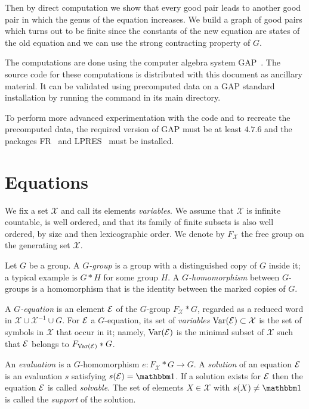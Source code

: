 \documentclass[a4paper,11pt]{amsart}
\begin{document}
Then by direct computation we show that every good pair leads to
another good pair in which the genus of the equation increases.  We
build a graph of good pairs which turns out to be finite since the
constants of the new equation are states of the old equation and we
can use the strong contracting property of $G$.

The computations are done
 using the computer algebra system GAP~\cite{GAP4}. The source
code for these computations is distributed with this document as
ancillary material. It can be validated using precomputed data on a
GAP standard installation by running the command  in its main directory.

To perform more advanced experimentation with the code and to recreate
the precomputed data, the required version of GAP must be at least
$4.7.6$ and the packages FR~\cite{FR2.3.6} and LPRES~\cite{LPRES0.3.0}
must be installed.

\section{Equations}
We fix a set $\mathcal{X}$ and call its elements \emph{variables}.  We
assume that $\mathcal{X}$ is infinite countable, is well ordered, and
that its family of finite subsets is also well ordered, by size and
then lexicographic order. We denote by $F_{\mathcal{X}}$ the free
group on the generating set $\mathcal{X}$.

\begin{defi}
  Let $G$ be a group. A \emph{$G$-group} is a group with a
  distinguished copy of $G$ inside it; a typical example is 
  $G*H$ for some group $H$. A \emph{$G$-homomorphism} 
  between $G$-groups is a homomorphism
  that is the identity between the marked copies of $G$.

  A \emph{$G$-equation} is an element $\mathcal{E}$ of the $G$-group
  $F_{\mathcal{X}} * G$, regarded as a reduced word in
  $\mathcal X\cup\mathcal X^{-1}\cup G$. For $\mathcal{E}$ a $G$-equation,
  its set of \emph{variables} $\textup{Var}(\mathcal{E})\subset \mathcal{X}$ is the
  set of symbols in $\mathcal{X}$ that occur in it; namely,
  $\textup{Var}(\mathcal{E})$ is the minimal subset of $\mathcal{X}$ such that
  $\mathcal{E}$ belongs to $F_{\textup{Var}(\mathcal{E})}*G$.

  An \emph{evaluation} is a $G$-homomorphism $e\colon F_{\mathcal{X}} * G \to G$.
  A \emph{solution} of an equation $\mathcal{E}$ is an evaluation $s$
  satisfying $s(\eq{E})=\id$. If a solution exists for $\mathcal{E}$ then the
  equation $\mathcal{E}$ is called \emph{solvable}. The set of elements
  $X\in \mathcal{X}$ with $s(X)\neq\id$ is called the \emph{support} of the solution.
\end{defi}
\end{document}
